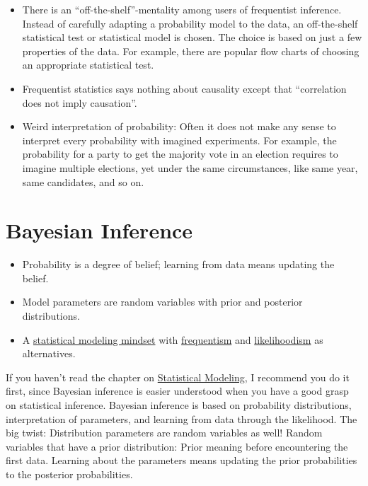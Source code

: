 \documentclass[
  10pt,
]{scrbook}
\providecommand{\tightlist}{%
  \setlength{\itemsep}{0pt}\setlength{\parskip}{0pt}}
\begin{document}
\begin{itemize}
\item
  There is an ``off-the-shelf''-mentality among users of frequentist inference. Instead of carefully adapting a probability model to the data, an off-the-shelf statistical test or statistical model is chosen. The choice is based on just a few properties of the data. For example, there are popular flow charts of choosing an appropriate statistical test.
\item
  Frequentist statistics says nothing about causality except that ``correlation does not imply causation''.
\item
  Weird interpretation of probability: Often it does not make any sense to interpret every probability with imagined experiments. For example, the probability for a party to get the majority vote in an election requires to imagine multiple elections, yet under the same circumstances, like same year, same candidates, and so on.
\end{itemize}

\hypertarget{bayesian-inference}{%
\chapter{Bayesian Inference}\label{bayesian-inference}}

\begin{itemize}
\tightlist
\item
  Probability is a degree of belief; learning from data means updating the belief.
\item
  Model parameters are random variables with prior and posterior distributions.
\item
  A \protect\hyperlink{statistical-modeling}{statistical modeling mindset} with \protect\hyperlink{frequentist-inference}{frequentism} and \protect\hyperlink{likelihoodism}{likelihoodism} as alternatives.
\end{itemize}

If you haven't read the chapter on \protect\hyperlink{statistical-modeling}{Statistical Modeling}, I recommend you do it first, since Bayesian inference is easier understood when you have a good grasp on statistical inference.
Bayesian inference is based on probability distributions, interpretation of parameters, and learning from data through the likelihood.
The big twist: Distribution parameters are random variables as well!
Random variables that have a prior distribution: Prior meaning before encountering the first data.
Learning about the parameters means updating the prior probabilities to the posterior probabilities.
\end{document}

